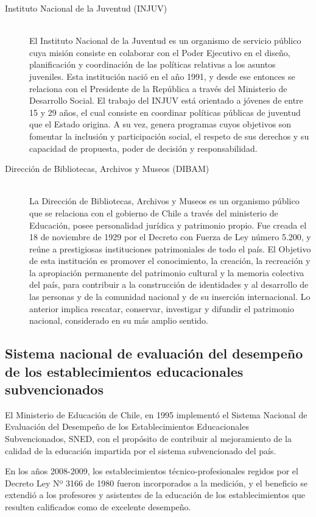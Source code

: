 \begin{description}
\begin{description}
\item[Instituto Nacional de la Juventud (INJUV)] \hfill \\
El Instituto Nacional de la Juventud es un organismo de servicio público cuya misión consiste en colaborar con el Poder Ejecutivo en el diseño, planificación y coordinación de las políticas relativas a los asuntos juveniles.
Esta institución nació en el año 1991, y desde ese entonces se relaciona con el Presidente de la República a través del Ministerio de Desarrollo Social.
El trabajo del INJUV está orientado a jóvenes de entre 15 y 29 años, el cual consiste en coordinar políticas públicas de juventud que el Estado origina. A su vez, genera programas cuyos objetivos son fomentar la inclusión y participación social, el respeto de sus derechos y su capacidad de propuesta, poder de decisión y responsabilidad. \cite{injuv} 
\item[Dirección de Bibliotecas, Archivos y Museos (DIBAM)] \hfill \\
La Dirección de Bibliotecas, Archivos y Museos es un organismo público que se relaciona con el gobierno de Chile a través del ministerio de Educación, posee personalidad jurídica y patrimonio propio.
Fue creada el 18 de noviembre de 1929 por el Decreto con Fuerza de Ley número 5.200, y reúne a prestigiosas instituciones patrimoniales de todo el país. 
El Objetivo de esta institución es promover el conocimiento, la creación, la recreación y la apropiación permanente del patrimonio cultural y la memoria colectiva del país, para contribuir a la construcción de identidades y al desarrollo de las personas y de la comunidad nacional y de su inserción internacional. Lo anterior implica rescatar, conservar, investigar y difundir el patrimonio nacional, considerado en su más amplio sentido.\cite{dibam}
\end{description}

\subsection{Sistema nacional de evaluación del desempeño de los establecimientos educacionales subvencionados}

El Ministerio de Educación de Chile, en 1995 implementó el Sistema Nacional de Evaluación del Desempeño de los Establecimientos Educacionales Subvencionados, SNED, con el propósito de contribuir al mejoramiento de la calidad de la educación impartida por el sistema subvencionado del país.

En los años 2008-2009, los establecimientos técnico-profesionales regidos por el Decreto Ley Nº 3166 de 1980 fueron incorporados a la medición, y el beneficio se extendió a los profesores y asistentes de la educación de los establecimientos que resulten calificados como de excelente desempeño.


\end{description}
